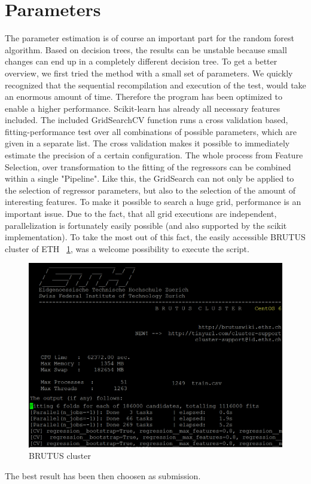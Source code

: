 \documentclass[a4paper, 11pt]{article}
\begin{document}
\section{Parameters}
The parameter estimation is of course an important part for the random forest algorithm. Based on decision trees, the results can be unstable because small changes can end up in a completely different decision tree. To get a better overview, we first tried the method with a small set of parameters. We quickly recognized that the sequential recompilation and execution of the test, would take an enormous amount of time. Therefore the program has been optimized to enable a higher performance.
Scikit-learn has already all necessary features included. The included GridSearchCV function runs a cross validation based, fitting-performance test over all combinations of possible parameters, which are given in a separate list. The cross validation makes it possible to immediately estimate the precision of a certain configuration. The whole process from Feature Selection, over transformation to the fitting of the regressors can be combined within a single "Pipeline". Like this, the GridSearch can not only be applied to the selection of regressor parameters, but also to the selection of the amount of interesting features.
To make it possible to search a huge grid, performance is an important issue. Due to the fact, that all grid executions are independent, parallelization is fortunately easily possible (and also supported by the scikit implementation). To take the most out of this fact, the easily accessible BRUTUS cluster of ETH ~\ref{fig:brutus}, was a welcome possibility to execute the script.
\begin{figure}	
	\centering
	\includegraphics[scale=0.6]{ScreenshotCluster.png}
	\caption{BRUTUS cluster}
	\label{fig:brutus}
\end{figure}
The best result has been then choosen as submission.
\end{document}
